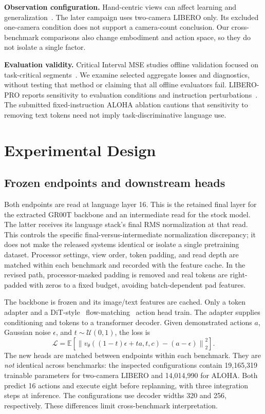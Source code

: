 \documentclass[conference]{IEEEtran}
\begin{document}
\textbf{Observation configuration.} Hand-centric views can affect learning and
generalization~\cite{handview}. The later campaign uses two-camera LIBERO only.
Its excluded one-camera condition does not support a camera-count conclusion.
Our cross-benchmark comparisons also change embodiment and action space, so
they do not isolate a single factor.

\textbf{Evaluation validity.} Critical Interval MSE studies offline validation
focused on task-critical segments~\cite{cimse}. We examine selected aggregate
losses and diagnostics, without testing that method or claiming that all offline
evaluators fail. LIBERO-PRO reports sensitivity to evaluation conditions and
instruction perturbations~\cite{liberopro}. The submitted fixed-instruction ALOHA ablation cautions that sensitivity to
removing text tokens need not imply task-discriminative language use.

\section{Experimental Design}
\subsection{Frozen endpoints and downstream heads}
Both endpoints are read at language layer 16. This is the retained final layer
for the extracted GR00T backbone and an intermediate read for the stock model.
The latter receives its language stack's final RMS normalization at that read.
This controls the specific final-versus-intermediate normalization discrepancy;
it does not make the released systems identical or isolate a single pretraining
dataset. Processor settings, view order, token padding, and read depth are
matched within each benchmark and recorded with the feature cache.
In the revised path, processor-masked padding is removed and real tokens are
right-padded with zeros to a fixed budget, avoiding batch-dependent pad features.

The backbone is frozen and its image/text features are cached. Only a token
adapter and a DiT-style~\cite{dit} flow-matching~\cite{flow} action head train.
The adapter supplies conditioning
and tokens to a transformer decoder. Given demonstrated actions $a$, Gaussian
noise $\epsilon$, and $t\sim\mathcal U(0,1)$, the loss is
\begin{equation}
 \mathcal L=\mathbb E\left[\left\|v_\theta((1-t)\epsilon+ta,t,c)
                    -(a-\epsilon)\right\|_2^2\right].
\end{equation}
The new heads are matched between endpoints within each benchmark. They are
\emph{not} identical across benchmarks: the inspected configurations contain
19,165,319 trainable parameters for two-camera LIBERO and 14,014,990 for ALOHA.
Both predict 16 actions and execute eight before replanning, with three
integration steps at inference. The configurations use decoder widths 320 and
256, respectively. These differences limit cross-benchmark interpretation.
\end{document}
